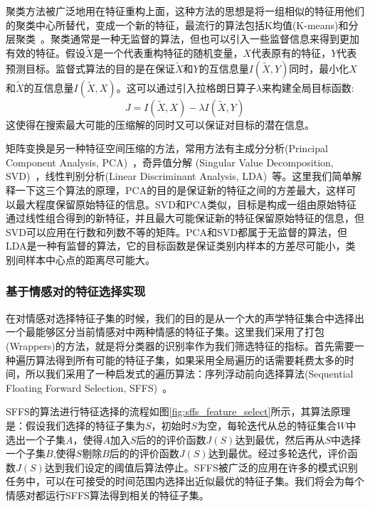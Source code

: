 聚类方法被广泛地用在特征重构上面，这种方法的思想是将一组相似的特征用他们的聚类中心所替代，变成一个新的特征，最流行的算法包括K均值(K-means)和分层聚类~\cite{Barker1998Pattern}。聚类通常是一种无监督的算法，但也可以引入一些监督信息来得到更加有效的特征。假设$\widetilde{X}$是一个代表重构特征的随机变量，$X$代表原有的特征，$Y$代表预测目标。监督式算法的目的是在保证$\widetilde{X}$和$Y$的互信息量$I(\widetilde{X}, Y)$同时，最小化$X$和$\widetilde{X}$的互信息量$I(\widetilde{X}, X)$。这可以通过引入拉格朗日算子$\lambda$来构建全局目标函数:
\begin{equation}
\label{equ:lagrange_multiplier}
    J=I(\widetilde{X}, X) - \lambda I(\widetilde{X}, Y)
\end{equation}
这使得在搜索最大可能的压缩解的同时又可以保证对目标的潜在信息。

矩阵变换是另一种特征空间压缩的方法，常用方法有主成分分析(Principal Component Analysis, PCA)~\cite{Jolliffe1986Principal}，奇异值分解 (Singular Value Decomposition, SVD)~\cite{Golub1970Singular}，线性判别分析(Linear Discriminant Analysis, LDA)~\cite{Mika1999Fisher}等。这里我们简单解释一下这三个算法的原理，PCA的目的是保证新的特征之间的方差最大，这样可以最大程度保留原始特征的信息。SVD和PCA类似，目标是构成一组由原始特征通过线性组合得到的新特征，并且最大可能保证新的特征保留原始特征的信息，但SVD可以应用在行数和列数不等的矩阵。PCA和SVD都属于无监督的算法，但LDA是一种有监督的算法，它的目标函数是保证类别内样本的方差尽可能小，类别间样本中心点的距离尽可能大。
 
\subsubsection{基于情感对的特征选择实现}
\label{sssec:emo_pair_feature_select_implement}
在对情感对选择特征子集的时候，我们的目的是从一个大的声学特征集合中选择出一个最能够区分当前情感对中两种情感的特征子集。这里我们采用了打包(Wrappers)的方法，就是将分类器的识别率作为我们筛选特征的指标。首先需要一种遍历算法得到所有可能的特征子集，如果采用全局遍历的话需要耗费太多的时间，所以我们采用了一种启发式的遍历算法：序列浮动前向选择算法(Sequential Floating Forward Selection, SFFS)~\cite{Ververidis2008Fast}。

SFFS的算法进行特征选择的流程如图\ref{fig:sffs_feature_select}所示，其算法原理是：假设我们选择的特征子集为$S$，初始时$S$为空，每轮迭代从总的特征集合$W$中选出一个子集$A$，使得$A$加入$S$后的的评价函数$J(S)$达到最优，然后再从$S$中选择一个子集$B$,使得$S$剔除$B$后的的评价函数$J(S)$达到最优。经过多轮迭代，评价函数$J(S)$达到我们设定的阈值后算法停止。SFFS被广泛的应用在许多的模式识别任务中，可以在可接受的时间范围内选择出近似最优的特征子集。我们将会为每个情感对都运行SFFS算法得到相关的特征子集。

